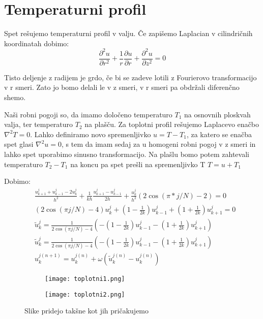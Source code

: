 \documentclass{article}
\begin{document}
\section{Temperaturni profil}

Spet rešujemo temperaturni profil v valju.
Če zapišemo Laplacian v cilindričnih koordinatah dobimo:
\begin{equation*}
\frac{\partial^2 u}{\partial r^2} + \frac{1}{r} \frac{\partial u}{\partial r} + \frac{\partial^2 u}{\partial z^2} = 0
\end{equation*}

Tisto deljenje z radijem je grdo, če bi se zadeve lotili z Fourierovo transformacijo v r smeri. Zato jo bomo delali le v z smeri, v r smeri pa obdržali diferenčno shemo. 

Naši robni pogoji so, da imamo določeno temperaturo $T_1$ na osnovnih ploskvah valja, ter temperaturo $T_2$ na plašču.
Za toplotni profil rešujemo Laplacevo enačbo $\nabla^2 T = 0$. Lahko definiramo novo spremenljivko $u = T - T_1$, za katero se enačba spet glasi $\nabla^2 u = 0$, s tem da imam sedaj za u homogeni robni pogoj v z smeri in lahko spet uporabimo sinusno transformacijo. Na plašlu bomo potem zahtevali temperaturo $T_2-T_1$ na koncu pa spet prešli na spremenljivko T $T = u  + T_1$

Dobimo:
\begin{align*}
&\frac{u^j_{k+1} + u^j_{k-1} - 2u^j_k}{h^2} + \frac{1}{kh} \frac{u^j_{k+1} - u^j_{k-1}}{2h} + \frac{u^j_k}{h^2}\left(2 \cos(\pi*j/N)-2\right) = 0 \\
& \left(2 \cos(\pi j /N) - 4 \right) u^j_k + \left(1 - \frac{1}{2k} \right) u^j_{k-1} + \left(1 + \frac{1}{2k} \right) u^j_{k+1} = 0  \\
&\tilde{u}^j_k = \frac{1}{2 \cos(\pi j /N) - 4}\left(-\left(1 - \frac{1}{2k} \right) u^j_{k-1} - \left(1 + \frac{1}{2k} \right) u^j_{k+1} \right) \\
&\tilde{u}^j_k = \frac{1}{2 \cos(\pi j /N) - 4}\left(-\left(1 - \frac{1}{2k} \right) u^j_{k-1} - \left(1 + \frac{1}{2k} \right) u^j_{k+1} \right) \\
&u^{j(n+1)}_k = u^{j(n)}_k + \omega \left( \tilde{u}^{j(n)}_k - u^{j(n)}_k \right)
\end{align*}

\begin{figure}[H]
\centering
\begin{subfigure}{.49\textwidth}
\texttt{[image: toplotni1.png]}
\end{subfigure}
\begin{subfigure}{.49\textwidth}
\texttt{[image: toplotni2.png]}
\end{subfigure}
\caption*{Slike pridejo takšne kot jih pričakujemo}
\end{figure}
\end{document}
